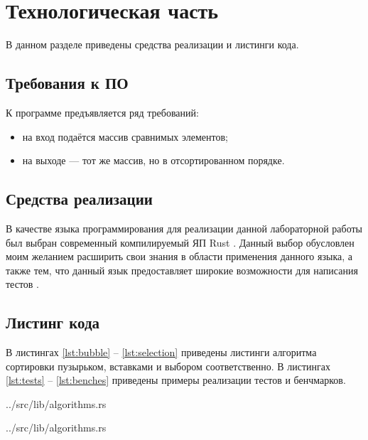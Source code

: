 \chapter{Технологическая часть}

В данном разделе приведены средства реализации и листинги кода.

\section{Требования к ПО}

К программе предъявляется ряд требований:
\begin{itemize}
	\item на вход подаётся массив сравнимых элементов;
	\item на выходе — тот же массив, но в отсортированном порядке.
\end{itemize}

\section{Средства реализации}

В качестве языка программирования для реализации данной лабораторной работы был выбран современный компилируемый ЯП Rust \cite{rustlang}. Данный выбор обусловлен моим желанием расширить свои знания в области применения данного языка, а также тем, что данный язык предоставляет широкие возможности для написания тестов \cite{rusttest}.

\section{Листинг кода}

В листингах \ref{lst:bubble} -- \ref{lst:selection} приведены листинги алгоритма сортировки пузырьком, вставками и выбором соответственно. В листингах \ref{lst:tests} -- \ref{lst:benches} приведены примеры реализации тестов и бенчмарков.

\begin{lstinputlisting}[
	caption={Алгоритм сортировки пузырьком},
	label={lst:bubble},
	style={rust},
	linerange={7-19}
]{../src/lib/algorithms.rs}
\end{lstinputlisting}

\begin{lstinputlisting}[
	caption={Алгоритм сортировки вставками},
	label={lst:insertions},
	style={rust},
	linerange={41-51}
]{../src/lib/algorithms.rs}
\end{lstinputlisting}


